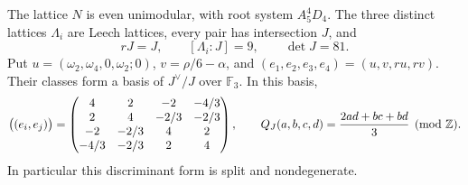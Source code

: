 \begin{statement}
The lattice \(N\) is even unimodular, with root system \(A_5^4D_4\).
The three distinct lattices \(\Lambda_i\) are Leech lattices, every
pair has intersection \(J\), and
\[
 rJ=J,\qquad [\Lambda_i:J]=9,\qquad\det J=81.
\]
Put \(u=(\omega_2,\omega_4,0,\omega_2;0)\),
\(v=\rho/6-\alpha\), and \((e_1,e_2,e_3,e_4)=(u,v,ru,rv)\).
Their classes form a basis of \(J^\vee/J\) over \(\mathbb F_3\).
In this basis,
\begin{equation}\label{eq:B-disc}
 \bigl((e_i,e_j)\bigr)=
 \begin{pmatrix}
 4&2&-2&-4/3\\2&4&-2/3&-2/3\\
 -2&-2/3&4&2\\-4/3&-2/3&2&4
 \end{pmatrix},\qquad
 Q_J(a,b,c,d)=\frac{2ad+bc+bd}{3}\pmod{\mathbb Z}.
\end{equation}
In particular this discriminant form is split and nondegenerate.
\end{statement}

